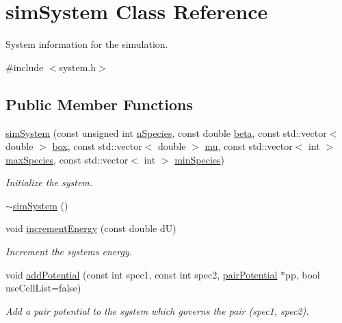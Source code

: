 \hypertarget{classsim_system}{}\section{sim\+System Class Reference}
\label{classsim_system}


System information for the simulation.  




{\ttfamily \#include $<$system.\+h$>$}

\subsection*{Public Member Functions}
\begin{DoxyCompactItemize}
\item 
\hyperlink{classsim_system_a6f55deb52fbdaf440603726c942aa6c7}{sim\+System} (const unsigned int \hyperlink{classsim_system_ab5e2e9b6204de15520302fe1d51688dd}{n\+Species}, const double \hyperlink{classsim_system_a3eeec9678902f8d7fce4dad6064aaf4c}{beta}, const std\+::vector$<$ double $>$ \hyperlink{classsim_system_a8bff9dfb95b1b09a0fab2c1c485ade07}{box}, const std\+::vector$<$ double $>$ \hyperlink{classsim_system_af1e3f5320aff976a448647244d5950d1}{mu}, const std\+::vector$<$ int $>$ \hyperlink{classsim_system_a93259b517f449f1ac610d132ac66b551}{max\+Species}, const std\+::vector$<$ int $>$ \hyperlink{classsim_system_afafda4a09ed180ee9c5580d196d8ca9f}{min\+Species})
\begin{DoxyCompactList}\small\item\em Initialize the system. \end{DoxyCompactList}\item 
\hyperlink{classsim_system_abaa6ad6ea00aa437cf0b9ac8034af327}{$\sim$sim\+System} ()
\item 
void \hyperlink{classsim_system_a6ad31c08955b80873f865b3069618dcb}{increment\+Energy} (const double d\+U)
\begin{DoxyCompactList}\small\item\em Increment the system\textquotesingle{}s energy. \end{DoxyCompactList}\item 
void \hyperlink{classsim_system_a37263732f36d1467d2dca67fa4f89100}{add\+Potential} (const int spec1, const int spec2, \hyperlink{classpair_potential}{pair\+Potential} $\ast$pp, bool use\+Cell\+List=false)
\begin{DoxyCompactList}\small\item\em Add a pair potential to the system which governs the pair (spec1, spec2). \end{DoxyCompactList}\item 

\end{DoxyCompactItemize}
